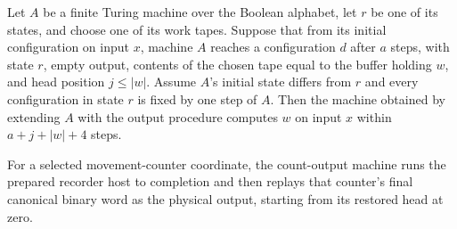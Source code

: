 \begin{lemma}
\label{Complexity.clOutputAt_compute}
\leanok
{}
Let $A$ be a finite Turing machine over the Boolean alphabet, let $r$ be one of its
states, and choose one of its work tapes. Suppose that from its initial configuration on
input $x$, machine $A$ reaches a configuration $d$ after $a$ steps, with state $r$,
empty output, contents of the chosen tape equal to the buffer holding $w$, and head
position $j\le |w|$. Assume $A$'s initial state differs from $r$ and every configuration
in state $r$ is fixed by one step of $A$. Then the machine obtained by extending $A$
with the output procedure computes $w$ on input $x$ within $a+j+|w|+4$ steps.
\end{lemma}

\begin{definition}
\label{Complexity.clCountOutputTM}
\leanok
{}
For a selected movement-counter coordinate, the count-output machine runs the prepared recorder host to completion and then replays that counter's final canonical binary word as the physical output, starting from its restored head at zero.
\end{definition}

